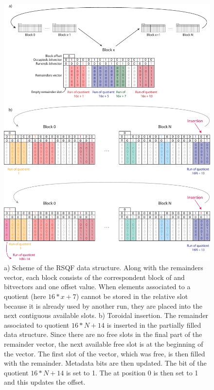 \begin{figure}[h!]
	\centering
	\includegraphics[width=\linewidth]{figures/kmer_methods/cqf_toricity_export.pdf}
	\caption[The RSQF data structure scheme and toroidal property]{a) Scheme of the RSQF data structure. Along with the remainders vector, each block consists of the correspondent block of \occs and \rends bitvectors and one offset value. When elements associated to a quotient (here $16*x + 7$) cannot be stored in the relative slot because it is already used by another run, they are placed into the next contiguous available slots.
	b) Toroidal insertion. The remainder associated to quotient $16*N + 14$ is inserted in the partially filled data structure. Since there are no free slots in the final part of the remainder vector, the next available free slot is at the beginning of the vector. The first slot of the vector, which was free, is then filled with the remainder. Metadata bits are then updated. The \occ bit of the quotient $16*N + 14$ is set to 1. The \rend at position 0 is then set to 1 and this updates the offset.} 
	\label{fig:cqf_toricity}
\end{figure}

